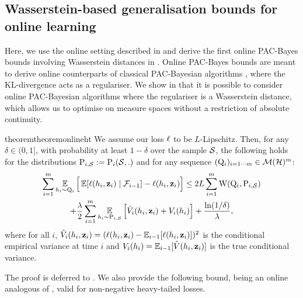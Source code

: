 \subsection{Wasserstein-based generalisation bounds for online learning}
\label{sec:wasserstein-online}
Here, we use the online setting described in  and derive the first online PAC-Bayes bounds involving Wasserstein distances in . 
Online PAC-Bayes bounds are meant to derive online counterparts of classical PAC-Bayesian algorithms \cite{haddouche2022online}, where the KL-divergence acts as a regulariser.
We show in   that it is possible to consider online PAC-Bayesian algorithms where the regulariser is a Wasserstein distance, which allows us to optimise on measure spaces without a restriction of absolute continuity.

\begin{restatable}{theorem}{theoremonlineht}\label{theorem:online-ht}
 We assume our loss $\loss$ to be $L$-Lipschitz.
Then, for any $\delta\in(0,1]$, with probability at least $1-\delta$ over the sample $\S$, the following holds for the distributions $\P_{i,\S}\defeq \P_i(\S,.)$ and for any sequence $(\Q_i)_{i=1\cdots m}\in\Mcal(\H)^m$:
\begin{multline*}
\sum_{i=1}^m \EE_{h_i\sim \Q_{i}} \Big[\EE[\loss(h_i,\z_i) \mid \Fcal_{i-1}] - \loss(h_i,\z_i) \Big]  \le 2L\sum_{i=1}^{m}\W(\Q_{i}, \P_{i,\S}) \\
+ \frac{\lambda}{2}\sum_{i=1}^m \EE_{h_i\sim \P_{i,\S}}\left[ \Vhat_i(h_i,\z_i) + V_i(h_i) \right]+\frac{\ln(1/\delta)}{\lambda}, 
\end{multline*}
where for all $i$, $\Vhat_i(h_i,\z_i)= (\loss(h_i,\z_i)-\EE_{i-1}[\loss(h_i,\z_i)])^2$ is the conditional empirical variance at time $i$ and $V_i(h_i)= \EE_{i-1}[\Vhat(h_i,\z_i)]$ is the true conditional variance.
\end{restatable}

The proof is deferred to .
We also provide the following bound, being an online analogous of , valid for non-negative heavy-tailed losses.


